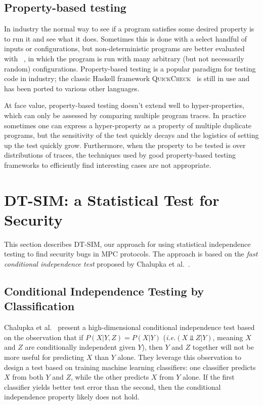\documentclass[acmlarge, manuscript, screen, review, anonymous, table]{acmart}
\newcommand{\ie}{\textit{i.e.}\xspace}
\newcommand{\toolname}{\textsc{DT-SIM}\xspace}
\begin{document}
\subsection{Property-based testing}

In industry the normal way to see if a program satisfies some desired property is to run it and see what it does.
Sometimes this is done with a select handful of inputs or configurations,
but non-deterministic programs are better evaluated with ~\cite{fink1997property, claessen2000quickcheck, paraskevopoulou2015foundational},
in which the program is run with many arbitrary (but not necessarily random) configurations.
Property-based testing is a popular paradigm for testing code in industry;
the classic Haskell framework \textsc{QuickCheck}~\cite{claessen2000quickcheck}
is still in use and has been ported to various other languages.

At face value, property-based testing doesn't extend well to hyper-properties,
which can only be assessed by comparing multiple program traces.
In practice sometimes one can express a hyper-property as a property of multiple duplicate programs,
but the sensitivity of the test quickly decays and the logistics of setting up the test quickly grow.
Furthermore, when the property to be tested is over distributions of traces,
the techniques used by good property-based testing frameworks to efficiently find interesting cases are not appropriate.



\section{\toolname: a Statistical Test for Security}

This section describes \toolname, our approach for using statistical independence testing to find security bugs in MPC protocols. The approach is based on the \emph{fast conditional independence test} proposed by Chalupka et al.~\cite{chalupka2018fast}.

\subsection{Conditional Independence Testing by Classification}

Chalupka et al.~\cite{chalupka2018fast} present a high-dimensional conditional independence test
based on the observation that if $P(X | Y, Z) = P(X | Y)$
(\ie $(X ⫫ Z | Y)$, meaning $X$ and $Z$ are conditionally independent given $Y$),
then $Y$ and $Z$ together will not be more useful for predicting $X$ than $Y$ alone.
They leverage this observation to design a test based on training machine learning classifiers:
one classifier predicts $X$ from both $Y$ and $Z$, while the other predicts $X$ from $Y$ alone.
If the first classifier yields better test error than the second,
then the conditional independence property likely does not hold.
\end{document}
